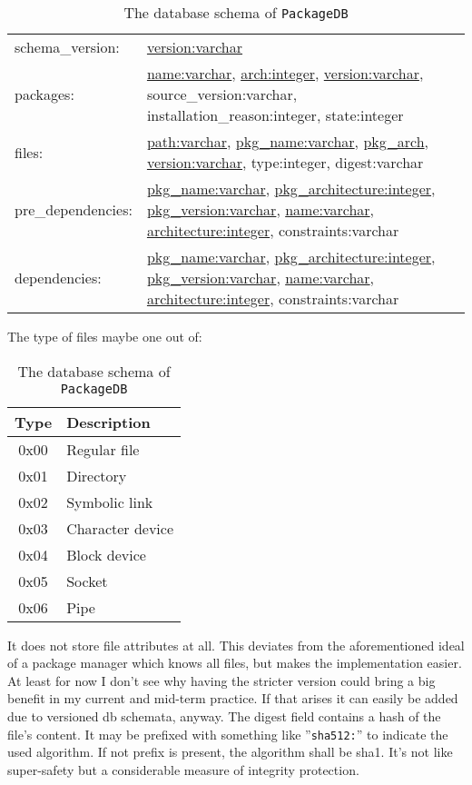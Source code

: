 \documentclass[a4paper]{scrartcl}
\newcommand{\module}[1]{\texttt{#1}}
\begin{document}
	\begin{table}[H]
		\centering
		
		{
		\setlength{\extrarowheight}{0.5eM}
		\begin{tabularx}{\textwidth}{lX}
			schema\_version: & \underline{version:varchar} \\
			packages: & \underline{name:varchar}, \underline{arch:integer}, \underline{version:varchar}, source\_version:varchar, installation\_reason:integer, state:integer \\
			
			files: & \underline{path:varchar}, \underline{pkg\_name:varchar}, \underline{pkg\_arch}, \underline{version:varchar}, type:integer, digest:varchar \\
			
			pre\_dependencies: & \underline{pkg\_name:varchar}, \underline{pkg\_architecture:integer}, \underline{pkg\_version:varchar}, \underline{name:varchar}, \underline{architecture:integer}, constraints:varchar \\
			dependencies: & \underline{pkg\_name:varchar}, \underline{pkg\_architecture:integer}, \underline{pkg\_version:varchar}, \underline{name:varchar}, \underline{architecture:integer}, constraints:varchar \\
		\end{tabularx}
		}
	
		\vspace{1eM}
		The type of files maybe one out of:
		
		\vspace{0.5eM}
		\begin{tabular}{c|l}
			Type & Description \\
			\hline
			0x00 & Regular file \\
			0x01 & Directory \\
			0x02 & Symbolic link \\
			0x03 & Character device \\
			0x04 & Block device \\
			0x05 & Socket \\
			0x06 & Pipe \\
		\end{tabular}
	
		\caption{The database schema of \module{PackageDB}}
		\label{tab:the_database_schema_of_packagedb}
	\end{table}
	
	It does not store file attributes at all. This deviates from the aforementioned ideal of a package manager which knows all files, but makes the implementation easier. At least for now I don't see why having the stricter version could bring a big benefit in my current and mid-term practice. If that arises it can easily be added due to versioned db schemata, anyway. The digest field contains a hash of the file's content. It may be prefixed with something like ''\texttt{sha512:}'' to indicate the used algorithm. If not prefix is present, the algorithm shall be sha1. It's not like super-safety but a considerable measure of integrity protection.
	
\end{document}
